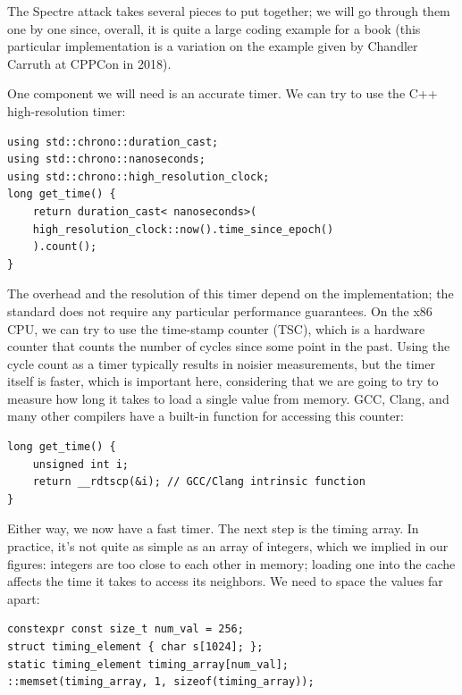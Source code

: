 
The Spectre attack takes several pieces to put together; we will go through them one by one since, overall, it is quite a large coding example for a book (this particular implementation is a variation on the example given by Chandler Carruth at CPPCon in 2018).

One component we will need is an accurate timer. We can try to use the C++ high-resolution timer:

\begin{lstlisting}[style=styleCXX]
using std::chrono::duration_cast;
using std::chrono::nanoseconds;
using std::chrono::high_resolution_clock;
long get_time() {
	return duration_cast< nanoseconds>(
	high_resolution_clock::now().time_since_epoch()
	).count();
}
\end{lstlisting}

The overhead and the resolution of this timer depend on the implementation; the standard does not require any particular performance guarantees. On the x86 CPU, we can try to use the time-stamp counter (TSC), which is a hardware counter that counts the number of cycles since some point in the past. Using the cycle count as a timer typically results in noisier measurements, but the timer itself is faster, which is important here, considering that we are going to try to measure how long it takes to load a single value from memory. GCC, Clang, and many other compilers have a built-in function for accessing this counter:

\begin{lstlisting}[style=styleCXX]
long get_time() {
	unsigned int i;
	return __rdtscp(&i); // GCC/Clang intrinsic function
}
\end{lstlisting}

Either way, we now have a fast timer. The next step is the timing array. In practice, it's not quite as simple as an array of integers, which we implied in our figures: integers are too close to each other in memory; loading one into the cache affects the time it takes to access its neighbors. We need to space the values far apart:

\begin{lstlisting}[style=styleCXX]
constexpr const size_t num_val = 256;
struct timing_element { char s[1024]; };
static timing_element timing_array[num_val];
::memset(timing_array, 1, sizeof(timing_array));
\end{lstlisting}

